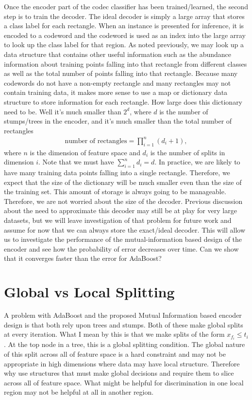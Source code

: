 \documentclass{article}
\begin{document}
Once the encoder part of the codec classifier has been trained/learned, the second step is to train the decoder.  The ideal decoder is simply a large array that stores a class label for each rectangle.  When an instance is presented for inference, it is encoded to a codeword and the codeword is used as an index into the large array to look up the class label for that region.  As noted previously, we may look up a data structure that contains other useful information such as the abundance information about training points falling into that rectangle from different classes as well as the total number of points falling into that rectangle.  Because many codewords do not have a non-empty rectangle and many rectangles may not contain training data, it makes more sense to use a map or dictionary data structure to store information for each rectangle.  How large does this dictionary need to be.  Well it's much smaller than $2^d$, where $d$ is the number of stumps/trees in the encoder, and it's much smaller than the total number of rectangles
\begin{gather*}
\text{number of rectangles} = \prod_{i=1}^n (d_i + 1),
\end{gather*}
where $n$ is the dimension of feature space and $d_i$ is the number of splits in dimension $i$.  Note that we must have $\sum_{i=1}^n d_i = d$.  In practice, we are likely to have many training data points falling into a single rectangle.  Therefore, we expect that the size of the dictionary will be much smaller even than the size of the training set.  This amount of storage is always going to be manageable.  Therefore, we are not worried about the size of the decoder.  Previous discussion about the need to approximate this decoder may still be at play for very large datasets, but we will leave investigation of that problem for future work and assume for now that we can always store the exact/ideal decoder.  This will allow us to investigate the performance of the mutual-information based design of the encoder and see how the probability of error decreases over time.  Can we show that it converges faster than the error for AdaBoost?

\section{Global vs Local Splitting}

A problem with AdaBoost and the proposed Mutual Information based encoder design is that both rely upon trees and stumps.  Both of these make global splits at every iteration.  What I mean by this is that we make splits of the form $x_{f_i} \leq t_i$.  At the top node in a tree, this is a global splitting condition.  The global nature of this split across all of feature space is a hard constraint and may not be appropriate in high dimensions where data may have local structure.  Therefore why use structures that must make global decisions and require them to slice across all of feature space.  What might be helpful for discrimination in one local region may not be helpful at all in another region.
\end{document}

